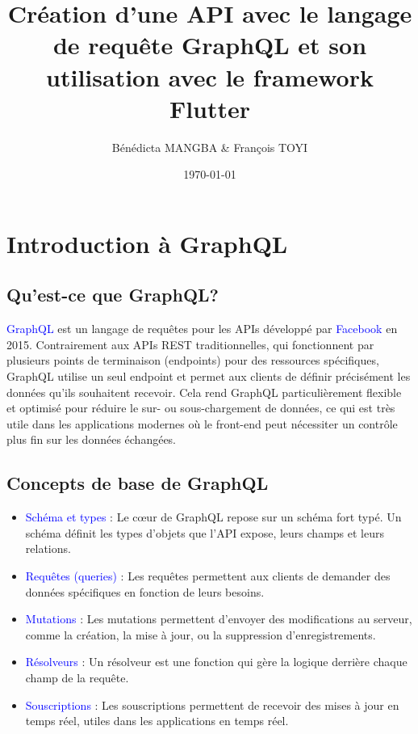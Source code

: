 \documentclass{article}
\title{Création d’une API avec le langage de requête
GraphQL et son utilisation avec le framework Flutter}
\author{Bénédicta MANGBA \& François TOYI}
\date{\today}
\begin{document}
\maketitle

\tableofcontents
\newpage

\section{Introduction à GraphQL}
\subsection{Qu'est-ce que GraphQL?}
\textcolor{blue}{GraphQL} est un langage de requêtes pour les APIs développé par \textcolor{blue}{Facebook} en 2015. Contrairement aux APIs REST traditionnelles, qui fonctionnent par plusieurs points de terminaison (endpoints) pour des ressources spécifiques, GraphQL utilise un seul endpoint et permet aux clients de définir précisément les données qu'ils souhaitent recevoir. Cela rend GraphQL particulièrement flexible et optimisé pour réduire le sur- ou sous-chargement de données, ce qui est très utile dans les applications modernes où le front-end peut nécessiter un contrôle plus fin sur les données échangées.

\subsection{Concepts de base de GraphQL}
\begin{itemize}
    \item \textcolor{blue}{Schéma et types} : Le cœur de GraphQL repose sur un schéma fort typé. Un schéma définit les types d'objets que l'API expose, leurs champs et leurs relations.
    \item \textcolor{blue}{Requêtes (queries)} : Les requêtes permettent aux clients de demander des données spécifiques en fonction de leurs besoins.
    \item \textcolor{blue}{Mutations} : Les mutations permettent d'envoyer des modifications au serveur, comme la création, la mise à jour, ou la suppression d'enregistrements.
    \item \textcolor{blue}{Résolveurs} : Un résolveur est une fonction qui gère la logique derrière chaque champ de la requête.
    \item \textcolor{blue}{Souscriptions} : Les souscriptions permettent de recevoir des mises à jour en temps réel, utiles dans les applications en temps réel.
\end{itemize}
\end{document}
